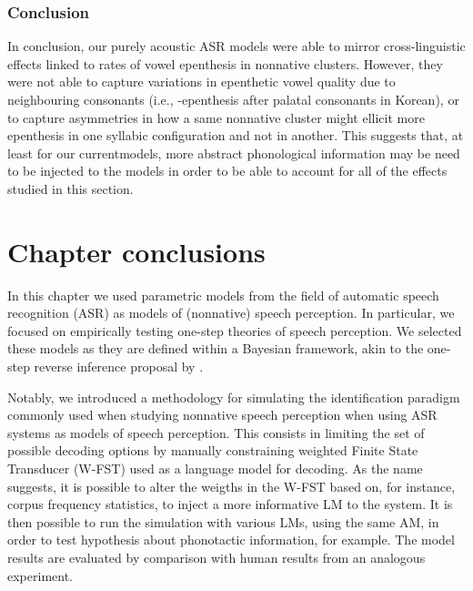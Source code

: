 {\subsubsection{Conclusion}
In conclusion, our purely acoustic ASR models were able to mirror cross-linguistic effects linked to rates of vowel epenthesis in nonnative clusters. However, they were not able to capture variations in epenthetic vowel quality due to neighbouring consonants (i.e., -epenthesis after palatal consonants in Korean), or to capture asymmetries in how a same nonnative cluster might ellicit more epenthesis in one syllabic configuration and not in another. This suggests that, at least for our currentmodels, more abstract phonological information may be need to be injected to the models in order to be able to account for all of the effects studied in this section.  


\newpage
\section{{\color{red}Chapter conclusions}}
In this chapter we used parametric models from the field of automatic speech recognition (ASR) as models of (nonnative) speech perception. In particular, we focused on empirically testing one-step theories of speech perception. We selected these models as they are defined within a Bayesian framework, akin to the one-step reverse inference proposal by \cite{wilson2013}.

Notably, we introduced a methodology for simulating the identification paradigm commonly used when studying nonnative speech perception when using ASR systems as models of speech perception. This consists in limiting the set of possible decoding options by manually constraining weighted Finite State Transducer (W-FST) used as a language model for decoding. As the name suggests, it is possible to alter the weigths in the W-FST based on, for instance, corpus frequency statistics, to inject a more informative LM to the system. It is then possible to run the simulation with various LMs, using the same AM, in order to test hypothesis about phonotactic information, for example.
The model results are evaluated by comparison with human results from an analogous experiment.

}
